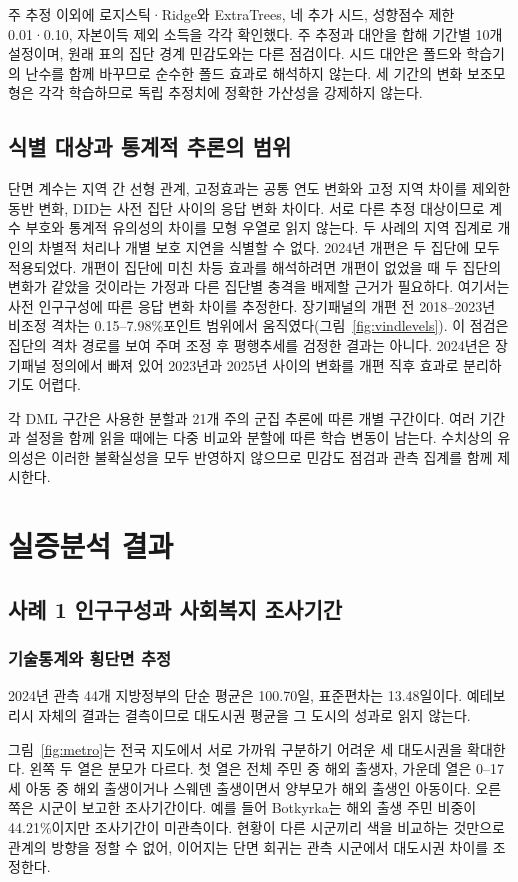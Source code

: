 \documentclass[11pt,a4paper]{article}
\begin{document}
주 추정 이외에 로지스틱·Ridge와 ExtraTrees, 네 추가 시드, 성향점수 제한 0.01·0.10, 자본이득 제외 소득을 각각 확인했다. 주 추정과 대안을 합해 기간별 10개 설정이며, 원래 표의 집단 경계 민감도와는 다른 점검이다. 시드 대안은 폴드와 학습기의 난수를 함께 바꾸므로 순수한 폴드 효과로 해석하지 않는다. 세 기간의 변화 보조모형은 각각 학습하므로 독립 추정치에 정확한 가산성을 강제하지 않는다.

\subsection{식별 대상과 통계적 추론의 범위}
단면 계수는 지역 간 선형 관계, 고정효과는 공통 연도 변화와 고정 지역 차이를 제외한 동반 변화, DID는 사전 집단 사이의 응답 변화 차이다. 서로 다른 추정 대상이므로 계수 부호와 통계적 유의성의 차이를 모형 우열로 읽지 않는다. 두 사례의 지역 집계로 개인의 차별적 처리나 개별 보호 지연을 식별할 수 없다. 2024년 개편은 두 집단에 모두 적용되었다. 개편이 집단에 미친 차등 효과를 해석하려면 개편이 없었을 때 두 집단의 변화가 같았을 것이라는 가정과 다른 집단별 충격을 배제할 근거가 필요하다. 여기서는 사전 인구구성에 따른 응답 변화 차이를 추정한다. 장기패널의 개편 전 2018--2023년 비조정 격차는 0.15--7.98\%포인트 범위에서 움직였다(그림~\ref{fig:vindlevels}). 이 점검은 집단의 격차 경로를 보여 주며 조정 후 평행추세를 검정한 결과는 아니다. 2024년은 장기패널 정의에서 빠져 있어 2023년과 2025년 사이의 변화를 개편 직후 효과로 분리하기도 어렵다.\par
각 DML 구간은 사용한 분할과 21개 주의 군집 추론에 따른 개별 구간이다. 여러 기간과 설정을 함께 읽을 때에는 다중 비교와 분할에 따른 학습 변동이 남는다. 수치상의 유의성은 이러한 불확실성을 모두 반영하지 않으므로 민감도 점검과 관측 집계를 함께 제시한다.

\clearpage\section{실증분석 결과}
\subsection{사례 1 인구구성과 사회복지 조사기간}
\subsubsection{기술통계와 횡단면 추정}
2024년 관측 44개 지방정부의 단순 평균은 100.70일, 표준편차는 13.48일이다. 예테보리시 자체의 결과는 결측이므로 대도시권 평균을 그 도시의 성과로 읽지 않는다.

그림~\ref{fig:metro}는 전국 지도에서 서로 가까워 구분하기 어려운 세 대도시권을 확대한다. 왼쪽 두 열은 분모가 다르다. 첫 열은 전체 주민 중 해외 출생자, 가운데 열은 0--17세 아동 중 해외 출생이거나 스웨덴 출생이면서 양부모가 해외 출생인 아동이다. 오른쪽은 시군이 보고한 조사기간이다. 예를 들어 Botkyrka는 해외 출생 주민 비중이 44.21\%이지만 조사기간이 미관측이다. 현황이 다른 시군끼리 색을 비교하는 것만으로 관계의 방향을 정할 수 없어, 이어지는 단면 회귀는 관측 시군에서 대도시권 차이를 조정한다.
\end{document}

